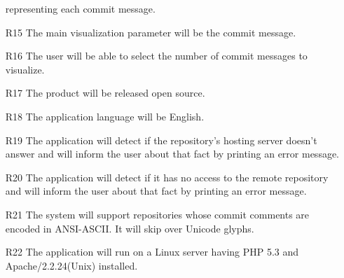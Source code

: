 \documentclass[12pt]{scrartcl}
\begin{document}
\begin{enumerate}
	representing each commit message.
\item [R15] The main visualization parameter will be the commit message.
\item [R16] The user will be able to select the number of commit messages to visualize. 
\item [R17] The product will be released open source.
\item [R18] The application language will be English.
\item [R19] The application will detect if the repository's hosting server doesn't answer and will inform the user about that fact by printing an error message.
\item [R20] The application will detect if it has no access to the remote repository and will inform the user about that fact by printing an error message.
\item [R21] The system will support repositories whose commit comments are encoded in
	ANSI-ASCII. It will skip over Unicode glyphs.
\item [R22] The application will run on a Linux server having PHP 5.3 and Apache/2.2.24(Unix) installed.
\end{enumerate}
\end{document}

